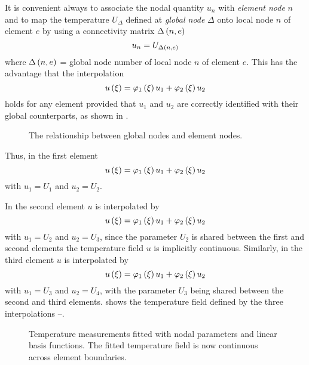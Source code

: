 It is convenient always to associate the nodal quantity $u_{n}$ with
\emph{element node} $n$ and to map the temperature $U_{\Delta}$ defined at
\emph{global node} $\Delta$ onto local node $n$ of element $e$ by using a
connectivity matrix $ \Delta\left( n,e \right) $ \ie
\begin{equation*}
  u_{n} = U_{ \Delta\left( n,e \right) }
\end{equation*}
where $ \Delta\left( n,e \right) $ = global node number of local node $n$ of element $e$.
This has the advantage that the interpolation 
\begin{equation*}
   u\left( \xi \right)  =    \varphi_{1} \left( \xi \right)   u_{1} +    \varphi_{2} \left( \xi \right)   u_{2}
\end{equation*}
holds for any element provided that $u_{1}$ and $u_{2}$ are correctly identified
with their global counterparts, as shown in .
\begin{figure}[htbp] \centering
  
  \caption{The relationship between global nodes and element nodes.}
  \label{fig:Relationship}
\end{figure}
Thus, in the first element
\begin{equation}
   u\left( \xi \right)  =    \varphi_{1} \left( \xi \right)  u_{1} +    \varphi_{2} \left( \xi \right)  u_{2}
  \label{eqn:1stelement}
\end{equation}
with $u_{1}=U_{1}$ and $u_{2}=U_{2}$.

In the second element $u$ is interpolated by
\begin{equation}
   u\left( \xi \right)   =     \varphi_{1} \left( \xi \right)  u_{1} +    \varphi_{2} \left( \xi \right)  u_{2}
  \label{eqn:2ndelement}
\end{equation}
with $u_{1}=U_{2}$ and $u_{2}=U_{3}$, since the parameter $U_{2}$ is shared
between the first and second elements the temperature field $u$ is implicitly
continuous. Similarly, in the third element $u$ is interpolated by
\begin{equation}
   u\left( \xi \right)  =    \varphi_{1} \left( \xi \right)  u_{1} +    \varphi_{2} \left( \xi \right)  u_{2}
  \label{eqn:3rdelement}
\end{equation}
with $u_{1}=U_{3}$ and $u_{2}=U_{4}$, with the parameter $U_{3}$ being shared
between the second and third elements.  shows the
temperature field defined by the three interpolations
--. 

\begin{figure}[htbp] \centering
  
  \caption{Temperature measurements fitted with nodal parameters and linear 
    basis functions.  The fitted temperature field is now continuous across
    element boundaries.}
  \label{fig:Tmfit}
\end{figure}

